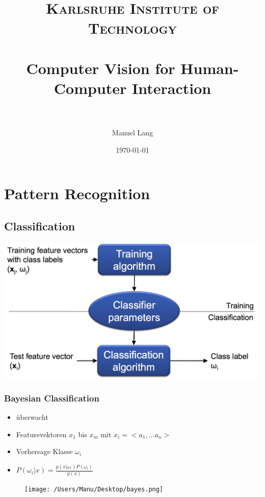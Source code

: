\documentclass[paper=a4, fontsize=11pt]{scrartcl} %
\title{	
\normalfont \normalsize 
\textsc{Karlsruhe Institute of Technology} \\ [25pt] %
\horrule{0.5pt} \\[0.4cm] %
\huge Computer Vision for Human-Computer Interaction\\ %
\horrule{2pt} \\[0.5cm] %
}
\author{Manuel Lang} %
\date{\normalsize\today} %
\numberwithin{equation}{section} %
\numberwithin{figure}{section} %
\numberwithin{table}{section} %
\begin{document}
\maketitle %


\section{Pattern Recognition}

\subsection{Classification}

\includegraphics[width=\textwidth]{Klassifizierung}

\subsubsection{Bayesian Classification}

\begin{minipage}{0.45\textwidth}
\begin{itemize}
\item überwacht
\item Featurevektoren $x_1$ bis $x_m$ mit $x_i = <a_1,...a_n>$
\item Vorhersage Klasse $\omega_i$
\item $P(\omega_i | x) = \frac{p(x|\omega_i)P(\omega_i)}{p(x)}$
\end{itemize}
\end{minipage} \hfill
\begin{minipage}{0.5\textwidth}
\begin{figure}[H]
\texttt{[image: /Users/Manu/Desktop/bayes.png]}
\end{figure}
\end{minipage}
\end{document}
